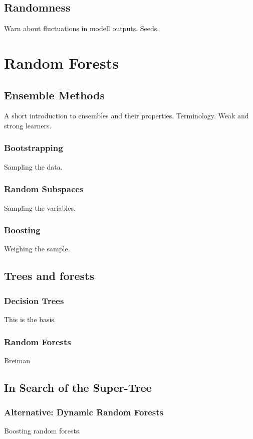 \documentclass[a4paper,man,12pt,apacite]{apa6} %
\begin{document}
\subsection{Randomness}
Warn about fluctuations in modell outputs. Seeds.

\section{Random Forests}

\subsection{Ensemble Methods}
A short introduction to ensembles and their properties. Terminology.
Weak and strong learners.

\subsubsection{Bootstrapping}
Sampling the data.

\subsubsection{Random Subspaces}
Sampling the variables.

\subsubsection{Boosting}
Weighing the sample.

\subsection{Trees and forests}

\subsubsection{Decision Trees}
This is the basis.

\subsubsection{Random Forests}
Breiman

\subsection{In Search of the Super-Tree}

\subsubsection{Alternative: Dynamic Random Forests}
Boosting random forests.
\end{document}

